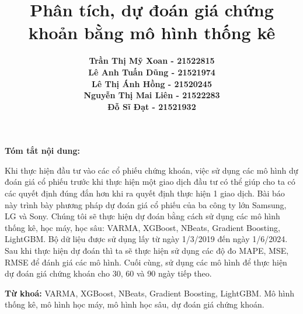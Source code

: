 \documentclass{article}
\begin{document}
\title{Phân tích, dự đoán giá chứng khoản bằng mô hình thống kê}
\author{
  \begin{tabular}{l}
    \textbf{Trần Thị Mỹ Xoan - 21522815 } \\
    \textbf{Lê Anh Tuấn Dũng - 21521974} \\
    \textbf{Lê Thị Ánh Hồng - 21520245} \\
    \textbf{Nguyễn Thị Mai Liên - 21522283} \\
    \textbf{Đỗ Sĩ Đạt - 21521932}
  \end{tabular}
}




\maketitle


\textbf{Tóm tắt nội dung:}

Khi thực hiện đầu tư vào các cổ phiếu chứng khoán, việc sử dụng các mô hình dự đoán giá cổ phiếu trước khi thực hiện một giao dịch đầu tư có thể giúp cho ta có các quyết định đúng đắn hơn khi ra quyết định thực hiện 1 giao dịch. Bài báo này trình bày phương pháp dự đoán giá cổ phiếu của ba công ty lớn Samsung, LG và Sony. Chúng tôi sẽ thực hiện dự đoán bằng cách sử dụng các mô hình thống kê, học máy, học sâu: VARMA, XGBoost, NBeats, Gradient Boosting, LightGBM. Bộ dữ liệu được sử dụng lấy từ ngày 1/3/2019 đến ngày 1/6/2024. Sau khi thực hiện dự đoán thì ta sẽ thực hiện sử dụng các độ đo MAPE, MSE, RMSE để đánh giá các mô hình. Cuối cùng, sử dụng các mô hình để thực hiện dự đoán giá chứng khoán cho 30, 60 và 90 ngày tiếp theo.


\vspace{1em} %


\textbf{Từ khoá:} VARMA, XGBoost, NBeats, Gradient Boosting, LightGBM. Mô hình thống kê, mô hình học máy, mô hình học sâu, dự đoán giá chứng khoán.
\end{document}
